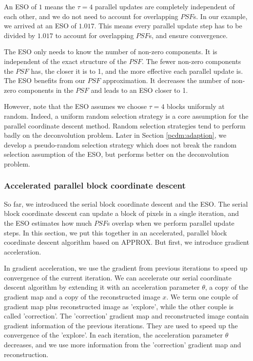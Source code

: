 An ESO of $1$ means the $\tau = 4$ parallel updates are completely independent of each other, and we do not need to account for overlapping $PSF$s. In our example, we arrived at an ESO of $1.017$. This means every parallel update step has to be divided by $1.017$ to account for overlapping $PSF$s, and ensure convergence.

The ESO only needs to know the number of non-zero components. It is independent of the exact structure of the $PSF$. The fewer non-zero components the $PSF$ has, the closer it is to 1, and the more effective each parallel update is. The ESO benefits from our $PSF$ approximation. It decreases the number of non-zero components in the $PSF$ and leads to an ESO closer to 1.

However, note that the ESO assumes we choose $\tau = 4$ blocks uniformly at random. Indeed, a uniform random selection strategy is a core assumption for the parallel coordinate descent method\cite{richtarik2016parallel}. Random selection strategies tend to perform badly on the deconvolution problem. Later in Section \ref{pcdm:adaption}, we develop a pseudo-random selection strategy which does not break the random selection assumption of the ESO, but performs better on the deconvolution problem.


\subsubsection{Accelerated parallel block coordinate descent} \label{pcdm:pcdm:approx}
So far, we introduced the serial block coordinate descent and the ESO. The serial block coordinate descent can update a block of pixels in a single iteration, and the ESO estimates how much $PSF$s overlap when we perform parallel update steps. In this section, we put this together in an accelerated, parallel block coordinate descent algorithm based on APPROX\cite{fercoq2015accelerated}. But first, we introduce gradient acceleration.

In gradient acceleration, we use the gradient from previous iterations to speed up convergence of the current iteration. We can accelerate our serial coordinate descent algorithm by extending it with an acceleration parameter $\theta$, a copy of the gradient map and a copy of the reconstructed image $x$.  We term one couple of gradient map plus reconstructed image as 'explore', while the other couple is called 'correction'. The 'correction' gradient map and reconstructed image contain gradient information of the previous iterations. They are used to speed up the convergence of the 'explore'. In each iteration, the acceleration parameter $\theta$ decreases, and we use more information from the 'correction' gradient map and reconstruction.

